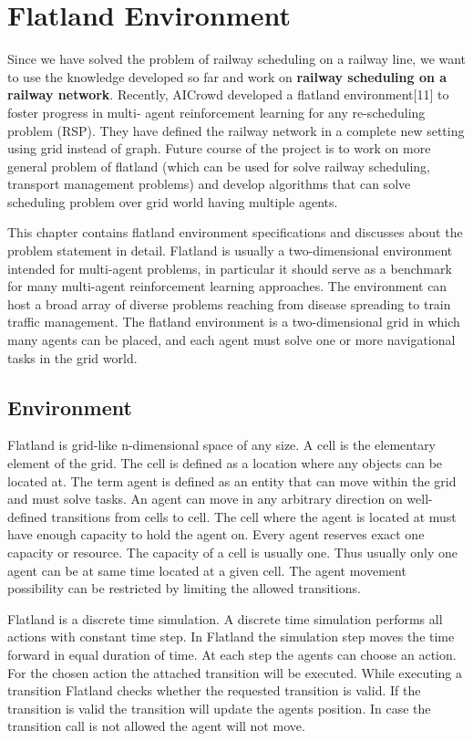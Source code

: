 \chapter{Flatland Environment}

Since we have solved the problem of railway scheduling on a railway line,
we want to use the knowledge developed
so far and work on \textbf{railway scheduling on a railway network}.
Recently, AICrowd developed a flatland environment[11] to foster progress in multi-
agent reinforcement learning for any re-scheduling problem (RSP). They have
defined the railway network in a complete new setting using grid instead of graph. Future
course of the project is to work on more general problem of flatland (which can be used for
solve railway scheduling, transport management problems) and develop algorithms that can
solve scheduling problem over grid world having multiple agents.

\vspace{\baselineskip}
This chapter contains flatland environment specifications and discusses about the problem statement in 
detail. Flatland is usually a two-dimensional environment intended for multi-agent problems, 
in particular it should serve as a benchmark for many multi-agent reinforcement learning approaches.
The environment can host a broad array of diverse problems reaching from disease spreading to train traffic management.
The flatland environment is a two-dimensional grid in which many agents can be placed,
and each agent must solve one or more navigational tasks in the grid world.

\section{Environment}
Flatland is grid-like n-dimensional space of any size. 
A cell is the elementary element of the grid. 
The cell is defined as a location where any objects can be located at. 
The term agent is defined as an entity that can move within the grid and must solve tasks.
 An agent can move in any arbitrary direction on well-defined transitions from cells to cell.
 The cell where the agent is located at must have enough capacity to hold the agent on. 
 Every agent reserves exact one capacity or resource. 
 The capacity of a cell is usually one. 
 Thus usually only one agent can be at same time located at a given cell. 
 The agent movement possibility can be restricted by limiting the allowed transitions.

 \vspace{\baselineskip}
 Flatland is a discrete time simulation. 
 A discrete time simulation performs all actions with constant time step. 
 In Flatland the simulation step moves the time forward in equal duration of time. 
 At each step the agents can choose an action. 
 For the chosen action the attached transition will be executed. 
 While executing a transition Flatland checks whether the requested transition is valid. 
 If the transition is valid the transition will update the agents position.
  In case the transition call is not allowed the agent will not move. 

